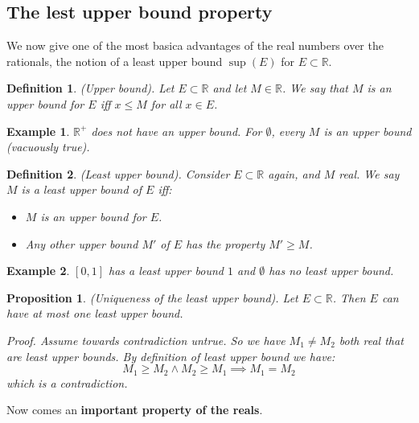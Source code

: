 \documentclass{article}
\newtheorem{example}{Example}[subsection]
\newtheorem{definition}{Definition}[subsection]
\newtheorem{proposition}{Proposition}[subsection]
\newcommand{\R}{\mathbb{R}}
\let\bf\textbf
\let\it\textit
\begin{document}
\subsection{The lest upper bound property}

We now give one of the most basica 
advantages of the real numbers 
over the rationals, the notion
of a least upper bound $\sup(E)$
for $E \subset \R$.

\begin{definition}
	(Upper bound). Let $E \subset \R$ and 
	let $M\in\R$. We say that 
	$M$ is an upper bound for $E$ 
	iff $x \leq M$ for all $x\in E$.
\end{definition}

\begin{example}
	$\R^+$ does not have an upper bound. 
	For $\emptyset$, every $M$ 
	is an upper bound (vacuously 
	true).
\end{example}

\begin{definition}
	(Least upper bound). Consider $E\subset \R$ 
	again, and $M$ real. We say $M$ is 
	a least upper bound of $E$ iff:
	\begin{itemize}
		\item $M$ is an upper bound for $E$.
		\item Any other upper bound $M'$ of $E$ 
			has the property $M' \geq M$.
	\end{itemize}
\end{definition}

\begin{example}
	$[0,1]$ has a least upper bound $1$ and 
	$\emptyset$ has no least upper bound.
\end{example}

\begin{proposition}
\label{uniqueness-of-least-upper-bound}
	(Uniqueness of the least upper bound). Let 
	$E \subset \R$. Then $E$ can have at most 
	one least upper bound.

	\it{Proof}. Assume towards contradiction 
	untrue. So we have $M_1 \neq M_2$ both 
	real that are least upper bounds. 
	By definition of least upper bound 
	we have:
	$$
	M_1 \geq M_2 \land M_2 \geq M_1 \implies M_1 = M_2
	$$
	which is a contradiction.
\end{proposition}

Now comes an \bf{important property of the reals}.
\end{document}

